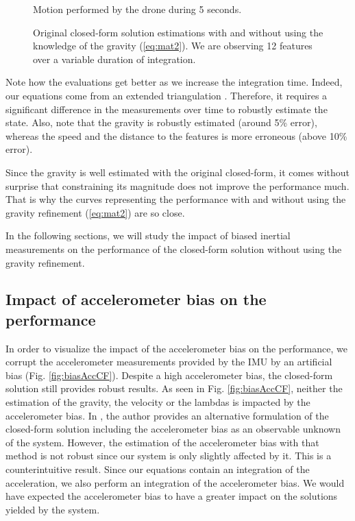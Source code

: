 \documentclass[letterpaper, 10 pt, journal, final]{ieeeconf}  %
\begin{document}
\begin{figure}
  \centering
  \resizebox{\columnwidth}{!}{}
    \caption{Motion performed by the drone during 5 seconds.\label{fig:trajectory}}
\end{figure}

\begin{figure}
  \centering
    \resizebox{0.7\columnwidth}{!}{}
    \caption{Original closed-form solution estimations with and without using the knowledge of the gravity (\ref{eq:mat2}). We are observing 12 features  over a variable duration of integration.\label{fig:original}}
\end{figure}


Note how the evaluations get better as we increase the integration time.
Indeed, our equations come from an extended triangulation \cite{Martinelli2012}.
Therefore, it requires a significant difference in the measurements over time to robustly estimate the state.
Also, note that the gravity is robustly estimated (around 5\% error), whereas the speed and the distance to the features is more erroneous (above 10\% error).

Since the gravity is well estimated with the original closed-form, it comes without surprise that constraining its magnitude does not improve the performance much.
That is why the curves representing the performance with and without using the gravity refinement (\ref{eq:mat2}) are so close.

In the following sections, we will study the impact of biased inertial measurements on the performance of the closed-form solution without using the gravity refinement.

\subsection{Impact of accelerometer bias on the performance}
In order to visualize the impact of the accelerometer bias on the performance,
we corrupt the accelerometer measurements provided by the IMU by an artificial bias (Fig. \ref{fig:biasAccCF}).
Despite a high accelerometer bias, the closed-form solution still provides robust results.
As seen in Fig. \ref{fig:biasAccCF}, neither the estimation of the gravity, the velocity or the lambdas is impacted by the accelerometer bias.
In \cite{Martinelli2014}, the author provides an alternative formulation of the closed-form solution including the accelerometer bias as an observable unknown of the system.
However, the estimation of the accelerometer bias with that method is not robust since our system is only slightly affected by it.
This is a counterintuitive result. Since our equations contain an integration of the acceleration, we also perform an integration of the accelerometer bias.
We would have expected the accelerometer bias to have a greater impact on the solutions yielded by the system.
\end{document}
